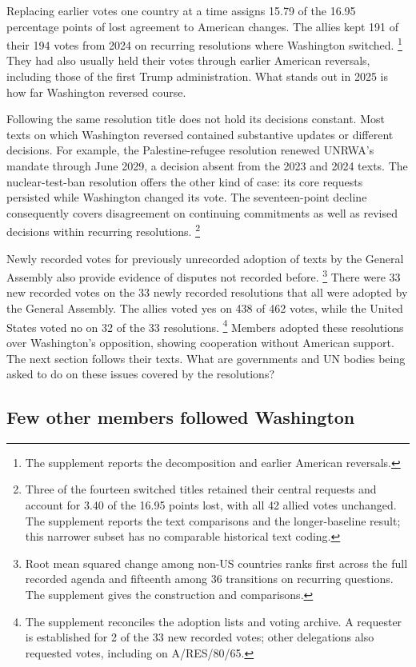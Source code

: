 \documentclass[12pt,authoryear]{elsarticle}
\begin{document}
Replacing earlier votes one country at a time assigns 15.79 of the 16.95 percentage points of lost agreement to American changes. The allies kept 191 of their 194 votes from 2024 on recurring resolutions where Washington switched. \footnote{The supplement reports the decomposition and earlier American reversals.} They had also usually held their votes through earlier American reversals, including those of the first Trump administration. What stands out in 2025 is how far Washington reversed course.

Following the same resolution title does not hold its decisions constant. Most texts on which Washington reversed contained substantive updates or different decisions. For example, the Palestine-refugee resolution renewed UNRWA's mandate through June 2029, a decision absent from the 2023 and 2024 texts. The nuclear-test-ban resolution offers the other kind of case: its core requests persisted while Washington changed its vote. The seventeen-point decline consequently covers disagreement on continuing commitments as well as revised decisions within recurring resolutions. \footnote{Three of the fourteen switched titles retained their central requests and account for 3.40 of the 16.95 points lost, with all 42 allied votes unchanged. The supplement reports the text comparisons and the longer-baseline result; this narrower subset has no comparable historical text coding.}

Newly recorded votes for previously unrecorded adoption of texts by the General Assembly also provide evidence of disputes not recorded before. \footnote{Root mean squared change among non-US countries ranks first across the full recorded agenda and fifteenth among 36 transitions on recurring questions. The supplement gives the construction and comparisons.} There were 33 new recorded votes on the 33 newly recorded resolutions that all were adopted by the General Assembly. The allies voted yes on 438 of 462 votes, while the United States voted no on 32 of the 33 resolutions. \footnote{The supplement reconciles the adoption lists and voting archive. A requester is established for 2 of the 33 new recorded votes; other delegations also requested votes, including on A/RES/80/65.} Members adopted these resolutions over Washington's opposition, showing cooperation without American support. The next section follows their texts. What are governments and UN bodies being asked to do on these issues covered by the resolutions?

\subsection{Few other members followed Washington}
\end{document}
